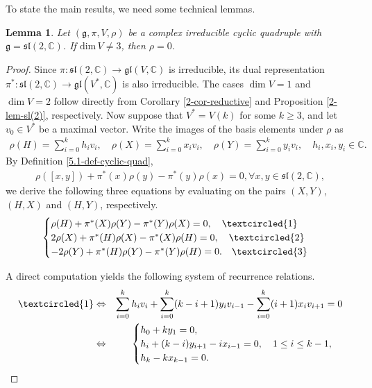 \documentclass[reqno]{amsart}
\newtheorem{lem}[thm]{Lemma}
\theoremstyle{definition}
\begin{document}
To state the main results, we need some technical lemmas.
\begin{lem}\label{5.2-lem1}
Let $(\mathfrak{g},\pi,V,\rho)$ be a complex irreducible cyclic quadruple with $\mathfrak{g}=\mathfrak{sl}(2,\mathbb{C})$. If $\mathrm{dim}\,V\neq 3$, then $\rho=0$.
\end{lem}
\begin{proof}
Since $\pi:\mathfrak{sl}(2,\mathbb{C})\rightarrow \mathfrak{gl}(V,\mathbb{C})$ is irreducible,
its dual representation $\pi^{*}:\mathfrak{sl}(2,\mathbb{C})\rightarrow \mathfrak{gl}(V^{*},\mathbb{C})$ is also  irreducible. The cases $\dim V=1$ and $\dim V=2$ follow directly from Corollary \ref{2-cor-reductive} and Proposition \ref{2-lem-sl(2)}, respectively.
Now suppose that $V^{*}=V(k)$ for some $k\geq 3$, and let  $v_{0}\in V^{*}$ be a maximal vector.
Write the images of the basis elements under $\rho$ as
\begin{eqnarray*}
\rho(H)=\sum_{i=0}^{k}h_{i}v_{i},\quad  \rho(X)=\sum_{i=0}^{k}x_{i}v_{i}, \quad \rho(Y)=\sum_{i=0}^{k}y_{i}v_{i},\quad h_{i},x_{i},y_{i}\in \mathbb{C}.
\end{eqnarray*}
By Definition \ref{5.1-def-cyclic-quad},
\begin{eqnarray*}
\rho([x,y])+\pi^{*}(x)\rho(y)-\pi^{*}(y)\rho(x)=0, \forall x,y\in \mathfrak{sl}(2,\mathbb{C}),
\end{eqnarray*}
we derive the following three equations by evaluating on the pairs $(X,Y)$, $(H,X)$ and $(H,Y)$, respectively.
\begin{eqnarray*}
\begin{cases}
\rho(H)+\pi^{*}(X)\rho(Y)-\pi^{*}(Y)\rho(X)=0, \quad \textcircled{1}\\
2\rho(X)+\pi^{*}(H)\rho(X)-\pi^{*}(X)\rho(H)=0,\quad  \textcircled{2} \\
-2\rho(Y)+\pi^{*}(H)\rho(Y)-\pi^{*}(Y)\rho(H)=0.\quad  \textcircled{3}
\end{cases}
\end{eqnarray*}

A direct computation yields the following system of recurrence relations.
\begin{eqnarray}\label{5-formu-1}
\textcircled{1}&\Leftrightarrow & \sum_{i=0}^{k}h_{i}v_{i}+\sum_{i=0}^{k}(k-i+1)y_{i}v_{i-1}-\sum_{i=0}^{k}(i+1)x_{i}v_{i+1}=0\nonumber\\
               &\Leftrightarrow & \begin{cases}
                                    h_{0}+ky_{1}=0,\\
                                    h_{i}+(k-i)y_{i+1}-ix_{i-1}=0,\quad  1\leq i\leq k-1,\\
                                     h_{k}-kx_{k-1}=0.
                                   \end{cases}
\end{eqnarray}


\end{proof}
\end{document}
